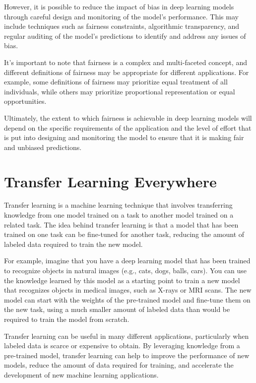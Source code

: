 However, it is possible to reduce the impact of bias in deep learning models through careful design and monitoring of the model’s performance. This may include techniques such as fairness constraints, algorithmic transparency, and regular auditing of the model’s predictions to identify and address any issues of bias.

It’s important to note that fairness is a complex and multi-faceted concept, and different definitions of fairness may be appropriate for different applications. For example, some definitions of fairness may prioritize equal treatment of all individuals, while others may prioritize proportional representation or equal opportunities.

Ultimately, the extent to which fairness is achievable in deep learning models will depend on the specific requirements of the application and the level of effort that is put into designing and monitoring the model to ensure that it is making fair and unbiased predictions.

\section{Transfer Learning Everywhere}

Transfer learning is a machine learning technique that involves transferring knowledge from one model trained on a task to another model trained on a related task. The idea behind transfer learning is that a model that has been trained on one task can be fine-tuned for another task, reducing the amount of labeled data required to train the new model.

For example, imagine that you have a deep learning model that has been trained to recognize objects in natural images (e.g., cats, dogs, balls, cars). You can use the knowledge learned by this model as a starting point to train a new model that recognizes objects in medical images, such as X-rays or MRI scans. The new model can start with the weights of the pre-trained model and fine-tune them on the new task, using a much smaller amount of labeled data than would be required to train the model from scratch.

Transfer learning can be useful in many different applications, particularly when labeled data is scarce or expensive to obtain. By leveraging knowledge from a pre-trained model, transfer learning can help to improve the performance of new models, reduce the amount of data required for training, and accelerate the development of new machine learning applications.

